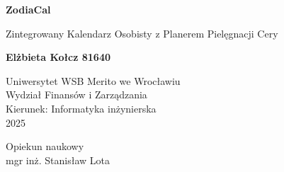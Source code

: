 \begin{titlepage}
    \begin{center}
        \vspace*{1cm}
        
        \Huge
        \textbf{ZodiaCal}
        
        \vspace{0.5cm}
        \LARGE
        Zintegrowany Kalendarz Osobisty z Planerem Pielęgnacji Cery

        \vspace{5cm}

        
        \textbf{Elżbieta Kołcz 81640}


        \vspace{0.5cm}

        \Large
        Uniwersytet WSB Merito we Wrocławiu\\
        Wydział Finansów i Zarządzania\\
        Kierunek: Informatyka inżynierska\\
        2025
        
        \vfill
        Opiekun naukowy\\
        mgr inż. Stanisław Lota

        
        \vspace{0.8cm}
    \end{center}
\end{titlepage}
